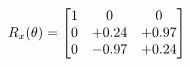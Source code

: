 \documentclass[preview]{standalone}
\begin{document}
\begin{align*}
\special{dvisvgm:raw <g id='unique000'>}R_{x}(\theta) = \begin{bmatrix}1 & 0 & 0 \\0 & +0.24 & +0.97 \\0 & -0.97 & +0.24\end{bmatrix}\special{dvisvgm:raw </g>}
\end{align*}
\end{document}
